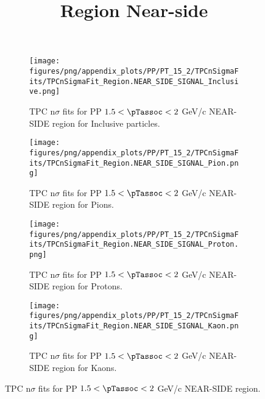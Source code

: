             \begin{figure}[H]
                \title{Region Near-side}
                \begin{subfigure}[b]{0.5\textwidth}
                    \centering
                    \texttt{[image: figures/png/appendix\_plots/PP/PT\_15\_2/TPCnSigmaFits/TPCnSigmaFit\_Region.NEAR\_SIDE\_SIGNAL\_Inclusive.png]}
                    \caption{TPC n$\sigma$ fits for PP $1.5 < \pTassoc < 2$ GeV/c NEAR-SIDE region for Inclusive particles.}
                    \label{fig:appendix_PP_$1.5 < \pTassoc < 2$ GeV/c_NEAR_SIDE_SIGNAL_Inclusive}
                \end{subfigure}
                \begin{subfigure}[b]{0.5\textwidth}
                    \centering
                    \texttt{[image: figures/png/appendix\_plots/PP/PT\_15\_2/TPCnSigmaFits/TPCnSigmaFit\_Region.NEAR\_SIDE\_SIGNAL\_Pion.png]}
                    \caption{TPC n$\sigma$ fits for PP $1.5 < \pTassoc < 2$ GeV/c NEAR-SIDE region for Pions.}
                    \label{fig:appendix_PP_$1.5 < \pTassoc < 2$ GeV/c_NEAR_SIDE_SIGNAL_Pion}
                \end{subfigure}
                \begin{subfigure}[b]{0.5\textwidth}
                    \centering
                    \texttt{[image: figures/png/appendix\_plots/PP/PT\_15\_2/TPCnSigmaFits/TPCnSigmaFit\_Region.NEAR\_SIDE\_SIGNAL\_Proton.png]}
                    \caption{TPC n$\sigma$ fits for PP $1.5 < \pTassoc < 2$ GeV/c NEAR-SIDE region for Protons.}
                    \label{fig:appendix_PP_$1.5 < \pTassoc < 2$ GeV/c_NEAR_SIDE_SIGNAL_Proton}
                \end{subfigure}
                \begin{subfigure}[b]{0.5\textwidth}
                    \centering
                    \texttt{[image: figures/png/appendix\_plots/PP/PT\_15\_2/TPCnSigmaFits/TPCnSigmaFit\_Region.NEAR\_SIDE\_SIGNAL\_Kaon.png]}
                    \caption{TPC n$\sigma$ fits for PP $1.5 < \pTassoc < 2$ GeV/c NEAR-SIDE region for Kaons.}
                    \label{fig:appendix_PP_$1.5 < \pTassoc < 2$ GeV/c_NEAR_SIDE_SIGNAL_Kaon}
                \end{subfigure}
                \caption{TPC n$\sigma$ fits for PP $1.5 < \pTassoc < 2$ GeV/c NEAR-SIDE region.}
                \label{fig:appendix_PP_$1.5 < \pTassoc < 2$ GeV/c_NEAR_SIDE_SIGNAL}
            \end{figure}
